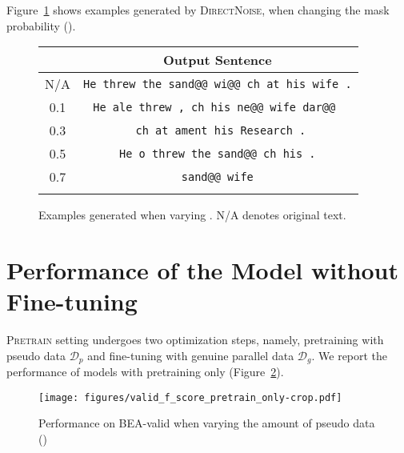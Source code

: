 \documentclass[11pt,a4paper]{article}
\newcommand{\mask}{}
\newcommand{\directnoise}{\textsc{DirectNoise}}
\newcommand{\pretrain}{\textsc{Pretrain}}
\newcommand{\pseudodata}{\ensuremath{\mathcal{D}_{p}}}
\newcommand{\genuinedata}{\ensuremath{\mathcal{D}_{g}}}
\begin{document}
Figure~\ref{fig:direct-noise} shows examples generated by \directnoise{}, when changing the mask probability ().

\begin{figure}[h]
\centering
\tabcolsep=1pt
\small
\begin{tabular}{cc}
  \toprule
   & Output Sentence\\
  \midrule
   N/A & \texttt{He threw the sand@@ wi@@ ch at his wife .}\\
   \midrule
   0.1 & \texttt{He ale threw , ch his ne@@ wife dar@@ \mask{}}\\
   \midrule
   0.3 & \texttt{\mask{} \mask{} \mask{} \mask{} ch at ament his Research .}\\
   \midrule
   0.5 & \texttt{He o threw the sand@@ ch \mask{} his \mask{} .}\\
   \midrule
   0.7 & \texttt{\mask{} \mask{} sand@@ \mask{} \mask{} \mask{} \mask{} wife \mask{}}\\
   \bottomrule
   \vspace{-5.0pt}\\
  \end{tabular}
  \vspace{-10.0pt}
\caption{Examples generated when varying . N/A denotes original text.}
\label{fig:direct-noise}
\end{figure}

\newpage
\section{Performance of the Model without Fine-tuning}
\pretrain{} setting undergoes two optimization steps, namely, pretraining with pseudo data \pseudodata{} and fine-tuning with genuine parallel data \genuinedata{}.
We report the performance of models with pretraining only (Figure~\ref{fig:result-pretrain}).

\begin{figure}[h]
  \center
  \texttt{[image: figures/valid\_f\_score\_pretrain\_only-crop.pdf]}
  \vskip -2mm
  \caption{Performance on BEA-valid when varying the amount of pseudo data ()}
  \label{fig:result-pretrain}
\end{figure}
\end{document}
